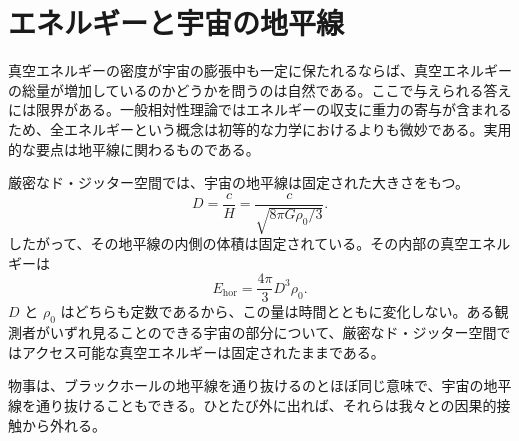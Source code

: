\begin{classroomqa}
\end{classroomqa}

\section{エネルギーと宇宙の地平線}

真空エネルギーの密度が宇宙の膨張中も一定に保たれるならば、真空エネルギーの総量が増加しているのかどうかを問うのは自然である。ここで与えられる答えには限界がある。一般相対性理論ではエネルギーの収支に重力の寄与が含まれるため、全エネルギーという概念は初等的な力学におけるよりも微妙である。実用的な要点は地平線に関わるものである。

厳密なド・ジッター空間では、宇宙の地平線は固定された大きさをもつ。
\begin{equation}
D=\frac{c}{H}
=\frac{c}{\sqrt{8\pi G\rho_0/3}}.
\end{equation}
したがって、その地平線の内側の体積は固定されている。その内部の真空エネルギーは
\begin{equation}
E_{\mathrm{hor}}=\frac{4\pi}{3}D^3\rho_0.
\end{equation}
\(D\) と \(\rho_0\) はどちらも定数であるから、この量は時間とともに変化しない。ある観測者がいずれ見ることのできる宇宙の部分について、厳密なド・ジッター空間ではアクセス可能な真空エネルギーは固定されたままである。

物事は、ブラックホールの地平線を通り抜けるのとほぼ同じ意味で、宇宙の地平線を通り抜けることもできる。ひとたび外に出れば、それらは我々との因果的接触から外れる。

\begin{classroomqa}
\end{classroomqa}

